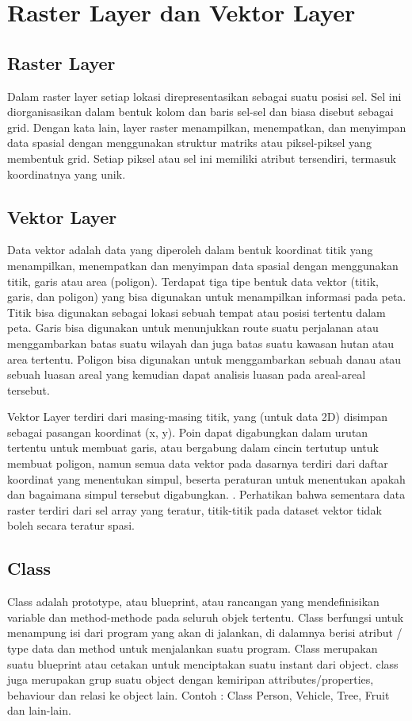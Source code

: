 

\section{Raster Layer dan Vektor Layer}

\subsection{Raster Layer}
Dalam raster layer  setiap lokasi direpresentasikan sebagai suatu posisi sel. 
Sel ini diorganisasikan dalam bentuk kolom dan baris sel-sel dan biasa disebut sebagai grid. 
Dengan kata lain,  layer raster menampilkan, menempatkan, 
dan menyimpan data spasial dengan menggunakan struktur matriks atau piksel-piksel yang membentuk grid. 
Setiap piksel atau sel ini memiliki atribut tersendiri, termasuk koordinatnya yang unik.


\subsection{Vektor Layer}
Data vektor adalah data yang diperoleh dalam bentuk koordinat titik yang menampilkan, 
menempatkan dan menyimpan data spasial dengan menggunakan titik, garis atau area (poligon). 
Terdapat tiga tipe bentuk data vektor (titik, garis, dan poligon) yang bisa digunakan untuk menampilkan informasi pada peta. 
Titik bisa digunakan sebagai lokasi sebuah tempat atau posisi tertentu dalam peta. 
Garis bisa digunakan untuk menunjukkan route suatu perjalanan atau menggambarkan batas suatu wilayah 
dan juga batas suatu kawasan hutan atau area tertentu. 
Poligon bisa digunakan untuk menggambarkan sebuah danau atau sebuah luasan areal yang kemudian dapat analisis luasan 
pada areal-areal tersebut.

Vektor Layer terdiri dari masing-masing titik, yang (untuk data 2D) disimpan sebagai pasangan koordinat (x, y). 
Poin dapat digabungkan dalam urutan tertentu untuk membuat garis, atau bergabung dalam cincin tertutup untuk 
membuat poligon, namun semua data vektor pada dasarnya terdiri dari daftar koordinat yang menentukan simpul, 
beserta peraturan untuk menentukan apakah dan bagaimana simpul tersebut digabungkan. .
Perhatikan bahwa sementara data raster terdiri dari sel array yang teratur, 
titik-titik pada dataset vektor tidak boleh secara teratur spasi.

\subsection{Class}
Class adalah prototype, atau blueprint, atau rancangan yang mendefinisikan variable dan method-methode pada seluruh objek tertentu. 
Class berfungsi untuk menampung isi dari program yang akan di jalankan, di dalamnya berisi atribut / type data dan method untuk menjalankan suatu program.
Class merupakan suatu blueprint atau cetakan untuk menciptakan suatu instant dari  object. class juga merupakan grup suatu object dengan kemiripan attributes/properties, behaviour dan relasi ke object lain. Contoh : Class Person, Vehicle, Tree, Fruit dan lain-lain.


